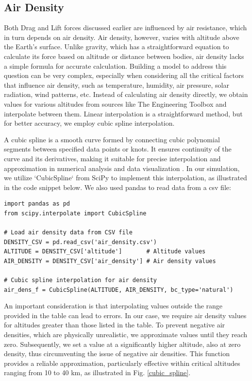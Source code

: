 \documentclass[runningheads]{llncs}
\begin{document}

\subsection{Air Density}
Both Drag and Lift forces discussed earlier are influenced by air resistance, which in turn depends on air density. Air density, however, varies with altitude above the Earth's surface. Unlike gravity, which has a straightforward equation to calculate its force based on altitude or distance between bodies, air density lacks a simple formula for accurate calculation.
Building a model to address this question can be very complex, especially when considering all the critical factors that influence air density, such as temperature, humidity, air pressure, solar radiation, wind patterns, etc. Instead of calculating air density directly, we obtain values for various altitudes from sources like The Engineering Toolbox \cite{air_dens_site} and interpolate between them. Linear interpolation is a straightforward method, but for better accuracy, we employ cubic spline interpolation.

A cubic spline is a smooth curve formed by connecting cubic polynomial segments between specified data points or knots. It ensures continuity of the curve and its derivatives, making it suitable for precise interpolation and approximation in numerical analysis and data visualization \cite{cubic_spline}. In our simulation, we utilize `CubicSpline` from SciPy to implement this interpolation, as illustrated in the code snippet below. We also used pandas to read data from a csv file:

\begin{verbatim}
import pandas as pd
from scipy.interpolate import CubicSpline

# Load air density data from CSV file
DENSITY_CSV = pd.read_csv('air_density.csv')
ALTITUDE = DENSITY_CSV['altitude']       # Altitude values
AIR_DENSITY = DENSITY_CSV['air_density'] # Air density values

# Cubic spline interpolation for air density
air_dens_f = CubicSpline(ALTITUDE, AIR_DENSITY, bc_type='natural')
\end{verbatim}

An important consideration is that interpolating values outside the range provided in the table can lead to errors. In our case, we require air density values for altitudes greater than those listed in the table. To prevent negative air densities, which are physically unrealistic, we approximate values until they reach zero. Subsequently, we set a value at a significantly higher altitude, also at zero density, thus circumventing the issue of negative air densities. This function provides a reliable approximation, particularly effective within critical altitudes ranging from 10 to 40 km, as illustrated in Fig. \ref{cubic_spline}.
\end{document}
